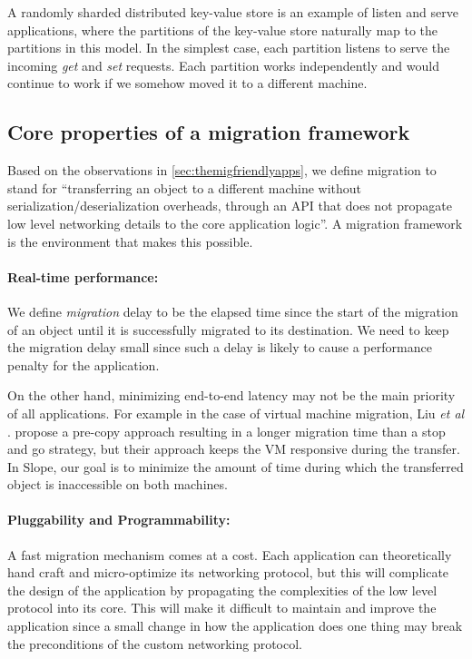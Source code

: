 A randomly sharded distributed key-value store is
an example of listen and serve applications, where the
partitions of the key-value store naturally map to the partitions in this
model. In the simplest case, each partition listens to serve the incoming
\emph{get} and \emph{set} requests. Each partition works independently and would continue to
work if we somehow moved it to a different machine.


\subsection{Core properties of a migration framework}
\label{subsec:coreprops}
Based on the observations in \autoref{sec:themigfriendlyapps}, we define
migration to stand for ``transferring an object to a
different machine without serialization/deserialization overheads, through an API that does not
propagate low level networking details to the core application logic''.
A
migration framework is the environment that makes this possible.

\paragraph{Real-time performance:}
We define \emph{migration} delay to be the elapsed time since the start of the
migration of an object until it is successfully migrated to its
destination. We need to keep the migration delay small since such a delay
is likely to cause a performance penalty for the application.

On the other hand, minimizing end-to-end latency may not be the main priority of all applications.
For example in the case of virtual machine migration, Liu \textit{et al}$.$ \cite{vmliu}
propose a pre-copy approach resulting in a longer migration time than a stop
and go strategy, but their approach keeps the VM responsive during the transfer.
In Slope, our goal is to minimize the amount of time during which the
transferred object is inaccessible on both machines.

\paragraph{Pluggability and Programmability:}
A fast migration mechanism comes at a cost. Each application
can theoretically hand craft and micro-optimize its networking protocol,
but this will complicate the design of the application by propagating
the complexities of the low level protocol into its core.
This will make it difficult to maintain and improve the
application since a small change in how the application does one thing
may break the preconditions of the custom networking protocol.

